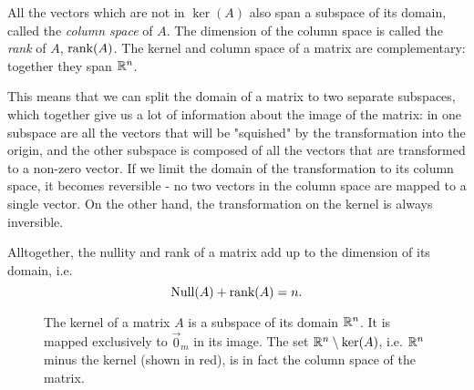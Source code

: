 All the vectors which are not in $\ker(A)$ also span a subspace of its domain, called the \emph{column space} of $A$. The dimension of the column space is called the \emph{rank} of $A$, $\rank(A)$. The kernel and column space of a matrix are complementary: together they span $\Rs[n]$.

This means that we can split the domain of a matrix to two separate subspaces, which together give us a lot of information about the image of the matrix: in one subspace are all the vectors that will be "squished" by the transformation into the origin, and the other subspace is composed of all the vectors that are transformed to a non-zero vector. If we limit the domain of the transformation to its column space, it becomes reversible - no two vectors in the column space are mapped to a single vector. On the other hand, the transformation on the kernel is always inversible.

Alltogether, the nullity and rank of a matrix add up to the dimension of its domain, i.e.
\begin{equation}
	\Null(A) + \rank(A) = n.
	\label{eq:}
\end{equation}

\begin{figure}[]
	\centering
	\caption{The kernel of a matrix $A$ is a subspace of its domain $\Rs[n]$. It is mapped exclusively to $\vec{0}_{m}$ in its image. The set $\Rs[n]\setminus\ker(A)$, i.e. $\Rs[n]$ minus the kernel (shown in red), is in fact the column space of the matrix.}
	\label{fig:kernel_subspace}
\end{figure}

